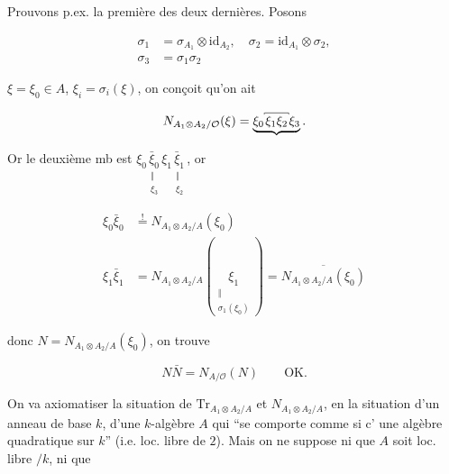 Prouvons p.ex. la première des deux dernières.   Posons

\[
\begin{aligned}
\sigma_1&=\sigma_{A_1}\otimes\mathrm{id}_{A_2},\quad\sigma_2=\mathrm{id}_{A_1}\otimes\sigma_2,\\
\sigma_3&=\sigma_1\sigma_2
\end{aligned}
\]

 $\xi=\xi_0\in A$,  $\xi_i=\sigma_i(\xi)$, on conçoit qu'on ait

\[
N_{A_1\otimes A_2/\mathcal O}(\xi)=\underbrace{\xi_0\overset{\rule[-1.1pt]{.35pt}{1.5pt}\rule{1.9em}{.4pt}\rule[-1.1pt]{.35pt}{1.5pt}}{\xi_1\xi_2}\xi_3}.
\]



Or le deuxième mb est $\xi_0\underset{\substack{\Vert\\\xi_3}}{\bar\xi_0}\xi_1\underset{\substack{\Vert\\\xi_2}}{\bar\xi_1}$, or

\[
\begin{aligned}
\xi_0\bar\xi_0&\overset{!}{=}N_{A_1\otimes A_2/A}(\xi_0)\\
\xi_1\bar\xi_1&=N_{A_1\otimes A_2/A}(\underset{\substack{\Vert\\\sigma_1(\xi_0)}}{\xi_1})
=\overline{N_{A_1\otimes A_2/A}(\xi_0)}
\end{aligned}
\]

donc  $N=N_{A_1\otimes A_2/A}(\xi_0)$, on trouve

\[
N\bar N=N_{A/\mathcal O}(N)\qquad\text{OK.}
\]


On va axiomatiser la situation de  $\mathrm{Tr}_{A_1\otimes A_2/A}$ et $N_{A_1\otimes A_2/A}$, en  la situation d'un anneau de base $k$,  d'une $k$-algèbre $A$ qui ``se comporte comme si c' une algèbre quadratique sur $k$'' (i.e. loc. libre de  $2$). Mais on ne suppose ni que $A$ soit loc. libre   $/k$, ni que

